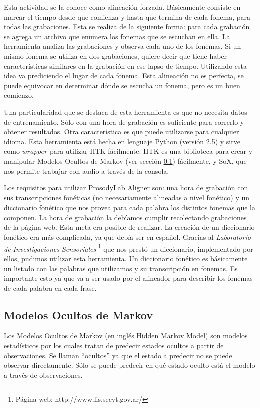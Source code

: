 Esta actividad se la conoce como alineación forzada. Básicamente consiste en marcar el tiempo desde que comienza y hasta que termina de cada fonema, para todas las grabaciones. Esta se realiza de la siguiente forma: para cada grabación se agrega un archivo que enumera los fonemas que se escuchan en ella. La herramienta analiza las grabaciones y observa cada uno de los fonemas. Si un mismo fonema se utiliza en dos grabaciones, quiere decir que tiene haber características similares en la grabación en ese lapso de tiempo. Utilizando esta idea va prediciendo el lugar de cada fonema. Esta alineación no es perfecta, se puede equivocar en determinar dónde se escucha un fonema, pero es un buen comienzo.  

Una particularidad que se destaca de esta herramienta es que no necesita datos de entrenamiento. Sólo con una hora de grabación es suficiente para correrlo y obtener resultados. Otra característica es que puede utilizarse para cualquier idioma. Esta herramienta está hecha en lenguaje Python (versión 2.5) y sirve como $wrapper$ para utilizar HTK fácilmente. HTK es una biblioteca para crear y manipular Modelos Ocultos de Markov (ver sección \ref{sec:hmm}) fácilmente, y SoX, que nos permite trabajar con audio a través de la consola. 

Los requisitos para utilizar ProsodyLab Aligner son: una hora de grabación con sus transcripciones fonéticas (no necesariamente alineadas a nivel fonético) y un diccionario fonético que nos provea para cada palabra los distintos fonemas que la componen. La hora de grabación la debíamos cumplir recolectando grabaciones de la página web. Esta meta era posible de realizar. La creación de un diccionario fonético era más complicada, ya que debía ser en español. Gracias al \textit{Laboratorio de Investigaciones Sensoriales} \footnote{Página web: http://www.lis.secyt.gov.ar/} que nos prestó un diccionario, implementado por ellos, pudimos utilizar esta herramienta. Un diccionario fonético es básicamente un listado con las palabras que utilizamos y su transcripción en fonemas. Es importante esto ya que va a ser usado por el alineador para describir los fonemas de cada palabra en cada frase.

\subsection{Modelos Ocultos de Markov}
\label{sec:hmm}
Los Modelos Ocultos de Markov \cite{rabiner} (en inglés Hidden Markov Model) son modelos estadísticos por los cuales tratan de predecir estados ocultos a partir de observaciones. Se llaman ``ocultos'' ya que el estado a predecir no se puede observar directamente. Sólo se puede predecir en qué estado oculto está el modelo a través de observaciones. 


